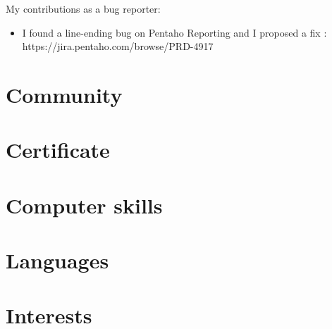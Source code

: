 \documentclass[11pt,a4paper,sans]{moderncv} %
\begin{document}
{
My contributions as a bug reporter:
\begin{itemize}
    \item I found a line-ending bug on Pentaho Reporting and I proposed a fix : https://jira.pentaho.com/browse/PRD-4917
\end{itemize}
}

\section{Community}

\section{Certificate}


\section{Computer skills}




\section{Languages}
\begin{small}
\end{small}



\section{Interests}
\end{document}
